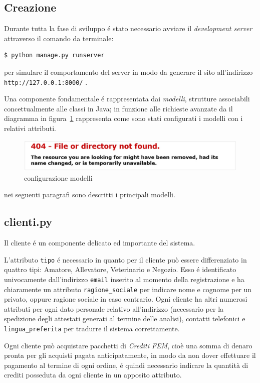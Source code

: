 \subsection{Creazione}
\label{subs:crea}
Durante tutta la fase di sviluppo é stato necessario avviare il \emph{development server} attraverso il comando da terminale:
\begin{verbatim}
$ python manage.py runserver
\end{verbatim}
per simulare il comportamento del server in modo da generare il sito all'indirizzo \texttt{http://127.0.0.1:8000/} .

Una componente fondamentale é rappresentata dai \emph{modelli}, strutture associabili concettualmente alle classi in Java; in funzione alle richieste avanzate da {\fem} il diagramma in figura~\ref{fig:modelli} rappresenta come sono stati configurati i modelli con i relativi attributi.

\begin{figure}
 \includegraphics[width=1\textwidth]{images/filenotfound} 
 \caption{configurazione modelli}
 \label{fig:modelli}
\end{figure}

nei seguenti paragrafi sono descritti i principali modelli.

\subsection*{clienti.py}
\label{subs:clienti}
Il cliente é un componente delicato ed importante del sistema. 

L'attributo \texttt{tipo} é necessario in quanto per {\fem} il cliente può essere differenziato in quattro tipi: Amatore, Allevatore, Veterinario e Negozio. Esso é identificato univocamente dall'indirizzo \texttt{email} inserito al momento della registrazione e ha chiaramente un attributo \texttt{ragione\_sociale} per indicare nome e cognome per un privato, oppure ragione sociale in caso contrario. Ogni cliente ha altri numerosi attributi per ogni dato personale relativo all'indirizzo (necessario per la spedizione degli attestati generati al termine delle analisi), contatti telefonici e \texttt{lingua\_preferita} per tradurre il sistema correttamente.

Ogni cliente può acquistare pacchetti di \emph{Crediti FEM}, cioè una somma di denaro pronta per gli acquisti pagata anticipatamente, in modo da non dover effettuare il pagamento al termine di ogni ordine, é quindi necessario indicare la quantità di crediti posseduta da ogni cliente in un apposito attributo.

